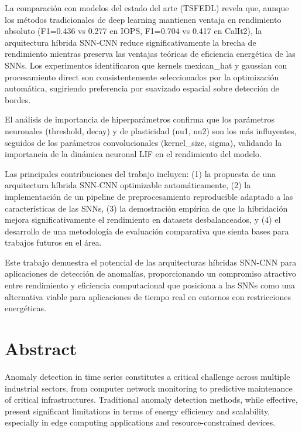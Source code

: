 La comparación con modelos del estado del arte (TSFEDL) revela que, aunque los métodos tradicionales de deep learning mantienen ventaja en rendimiento absoluto (F1=0.436 vs 0.277 en IOPS, F1=0.704 vs 0.417 en CalIt2), la arquitectura híbrida SNN-CNN reduce significativamente la brecha de rendimiento mientras preserva las ventajas teóricas de eficiencia energética de las SNNs. Los experimentos identificaron que kernels mexican\_hat y gaussian con procesamiento direct son consistentemente seleccionados por la optimización automática, sugiriendo preferencia por suavizado espacial sobre detección de bordes.

El análisis de importancia de hiperparámetros confirma que los parámetros neuronales (threshold, decay) y de plasticidad (nu1, nu2) son los más influyentes, seguidos de los parámetros convolucionales (kernel\_size, sigma), validando la importancia de la dinámica neuronal LIF en el rendimiento del modelo.

Las principales contribuciones del trabajo incluyen: (1) la propuesta de una arquitectura híbrida SNN-CNN optimizable automáticamente, (2) la implementación de un pipeline de preprocesamiento reproducible adaptado a las características de las SNNs, (3) la demostración empírica de que la hibridación mejora significativamente el rendimiento en datasets desbalanceados, y (4) el desarrollo de una metodología de evaluación comparativa que sienta bases para trabajos futuros en el área.

Este trabajo demuestra el potencial de las arquitecturas híbridas SNN-CNN para aplicaciones de detección de anomalías, proporcionando un compromiso atractivo entre rendimiento y eficiencia computacional que posiciona a las SNNs como una alternativa viable para aplicaciones de tiempo real en entornos con restricciones energéticas.

\chapter*{Abstract}
\label{chap:resumen}

Anomaly detection in time series constitutes a critical challenge across multiple industrial sectors, from computer network monitoring to predictive maintenance of critical infrastructures. Traditional anomaly detection methods, while effective, present significant limitations in terms of energy efficiency and scalability, especially in edge computing applications and resource-constrained devices.

